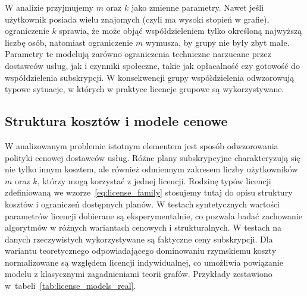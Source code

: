 W analizie przyjmujemy $m$ oraz $k$ jako zmienne parametry. Nawet jeśli użytkownik posiada wielu znajomych (czyli ma wysoki stopień w grafie), ograniczenie $k$ sprawia, że może objąć współdzieleniem tylko określoną najwyższą liczbę osób, natomiast ograniczenie $m$ wymusza, by grupy nie były zbyt małe. Parametry te modelują zarówno ograniczenia techniczne narzucane przez dostawców usług, jak i czynniki społeczne, takie jak opłacalność czy gotowość do współdzielenia subskrypcji. W konsekwencji grupy współdzielenia odwzorowują typowe sytuacje, w których w praktyce licencje grupowe są wykorzystywane.

\subsection{Struktura kosztów i modele cenowe}

W analizowanym problemie istotnym elementem jest sposób odwzorowania polityki cenowej dostawców usług.
Różne plany subskrypcyjne charakteryzują się nie tylko innym kosztem, ale również odmiennym zakresem liczby użytkowników $m$ oraz $k$, którzy mogą korzystać z jednej licencji.
Rodzinę typów licencji zdefiniowaną we wzorze~\eqref{eq:license_family} stosujemy tutaj do opisu struktury kosztów i ograniczeń dostępnych planów.
W testach syntetycznych wartości parametrów licencji dobierane są eksperymentalnie, co pozwala badać zachowanie algorytmów w różnych wariantach cenowych i strukturalnych.
W testach na danych rzeczywistych wykorzystywane są faktyczne ceny subskrypcji.
Dla wariantu teoretycznego odpowiadającego dominowaniu rzymskiemu koszty normalizowane są względem licencji indywidualnej, co umożliwia powiązanie modelu z klasycznymi zagadnieniami teorii grafów.
Przykłady zestawiono w~tabeli~\ref{tab:license_models_real}.


